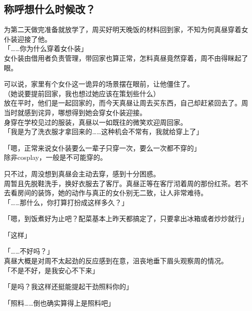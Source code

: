 \subsection{称呼想什么时候改？}

为第二天做完准备就放学了，周买好明天晚饭的材料回到家，不知为何真昼穿着女仆装迎接了他。\\

「……你为什么穿着女仆装」\\

女仆装由借用者负责管理，带回家也算正常，怎料真昼竟然穿着，周不由得眯起了眼。

可以说，家里有个女仆这一诡异的场景摆在眼前，让他僵住了。\\

（她说要提前回家，我也想过她应该在策划些什么）\\

放在平时，他们是一起回家的，而今天真昼让周去买东西，自己却赶紧回去了。周当时就感到诧异，哪想得到她会穿女仆装迎接。\\

身穿在学校见过的服装，真昼以一如既往的微笑欢迎周回家。\\

「我是为了洗衣服才拿回来的……这种机会不常有，我就给穿上了」

「嗯，正常来说女仆装要么一辈子只穿一次，要么一次都不穿的」\\

除非cosplay，一般是不可能穿的。

只不过，周没想到真昼会主动去穿，感到十分困惑。\\

周暂且先脱鞋洗手，换好衣服去了客厅。真昼正等在客厅沏着周的那份红茶。若不去看房间的装饰，她的动作与真正的女仆别无二致，让人非常难待。\\

「……那什么，你打算打扮成这样多久？」

「嗯，到饭煮好为止吧？配菜基本上昨天都搞定了，只要拿出冰箱或者炒炒就行」

「这样」

「……不好吗？」\\

真昼大概是对周不太起劲的反应感到在意，沮丧地垂下眉头观察周的情况。\\

「不是不好，是我安心不下来」

「是吗？我这样还挺能提起干劲照料你的」

「照料……倒也确实算得上是照料吧」

